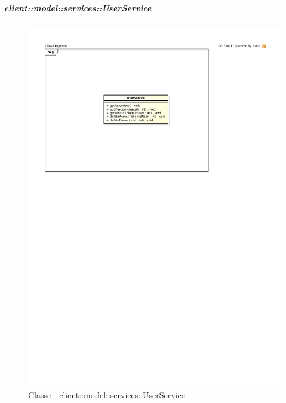		\subparagraph{client::model::services::UserService} %
		\label{subp:client_model_services_userservice}
		\begin{figure}[htbp]
				\centering
				\centerline{\includegraphics[scale=1.15]{./images/client/classes/model/user_service.pdf}}
				\caption{Classe - client::model::services::UserService}
			\end{figure}
